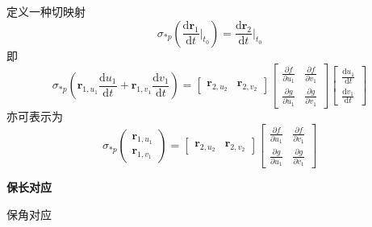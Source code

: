 定义一种切映射
\begin{equation}
    \sigma_{*p}\left(\frac{\mathrm{d}\mathbf{r}_{1}}{\mathrm{d}t}|_{t_{0}}\right)
    = \frac{\mathrm{d}\mathbf{r}_{2}}{\mathrm{d}t}|_{t_{0}}
\end{equation}
即
\begin{equation}
    \sigma_{*p}\left(\mathbf{r}_{1,u_{1}}\frac{\mathrm{d}u_{1}}{\mathrm{d}t}+\mathbf{r}_{1,v_{1}}\frac{\mathrm{d}v_{1}}{\mathrm{d}t}\right)=
    \left[\begin{array}{cc}
        \mathbf{r}_{2,u_{2}} & \mathbf{r}_{2,v_{2}}
    \end{array}\right]\left[\begin{array}{cc}
        \frac{\partial f}{\partial u_{1}} & \frac{\partial f}{\partial v_{1}} \\
        \frac{\partial g}{\partial u_{1}} & \frac{\partial g}{\partial v_{1}}
    \end{array}\right]\left[\begin{array}{cc}
        \frac{\mathrm{d}u_{1}}{\mathrm{d}t} \\ \frac{\mathrm{d}v_{1}}{\mathrm{d}t}
    \end{array}\right]
\end{equation}
亦可表示为
\begin{equation}
    \sigma_{*p}\left(\begin{array}{c}
        \mathbf{r}_{1,u_{1}} \\ \mathbf{r}_{1,v_{1}}
    \end{array}\right)=\left[\begin{array}{cc}
        \mathbf{r}_{2,u_{2}} & \mathbf{r}_{2,v_{2}}
    \end{array}\right]\left[\begin{array}{cc}
        \frac{\partial f}{\partial u_{1}} & \frac{\partial f}{\partial v_{1}} \\
        \frac{\partial g}{\partial u_{1}} & \frac{\partial g}{\partial v_{1}}
    \end{array}\right]
\end{equation}


\textbf{保长对应}


保角对应
